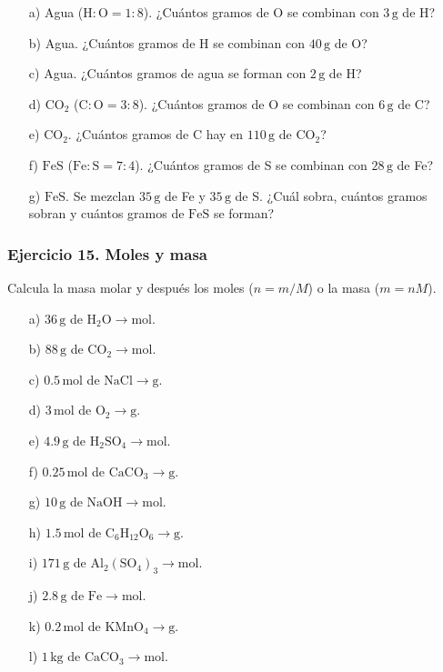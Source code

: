 \begin{enumerate}
    \item[a)] Agua ($\mathrm{H}:\mathrm{O}=1:8$).
    ¿Cuántos gramos de O se combinan con $3\,\mathrm{g}$ de H?
    \item[b)] Agua.
    ¿Cuántos gramos de H se combinan con $40\,\mathrm{g}$ de O?
    \item[c)] Agua.
    ¿Cuántos gramos de agua se forman con $2\,\mathrm{g}$ de H?
    \item[d)] $\mathrm{CO_2}$ ($\mathrm{C}:\mathrm{O}=3:8$).
    ¿Cuántos gramos de O se combinan con $6\,\mathrm{g}$ de C?
    \item[e)] $\mathrm{CO_2}$.
    ¿Cuántos gramos de C hay en $110\,\mathrm{g}$ de $\mathrm{CO_2}$?
    \item[f)] $\mathrm{FeS}$ ($\mathrm{Fe}:\mathrm{S}=7:4$).
    ¿Cuántos gramos de S se combinan con $28\,\mathrm{g}$ de Fe?
    \item[g)] $\mathrm{FeS}$.
    Se mezclan $35\,\mathrm{g}$ de Fe y $35\,\mathrm{g}$ de S.
    ¿Cuál sobra, cuántos gramos sobran y cuántos gramos de $\mathrm{FeS}$
    se forman?
\end{enumerate}

\subsubsection*{Ejercicio 15. Moles y masa}

Calcula la masa molar y después los moles ($n=m/M$)
o la masa ($m=nM$).

\begin{enumerate}
    \item[a)] $36\,\mathrm{g}$ de $\mathrm{H_2O}\rightarrow\mathrm{mol}$.
    \item[b)] $88\,\mathrm{g}$ de $\mathrm{CO_2}\rightarrow\mathrm{mol}$.
    \item[c)] $0.5\,\mathrm{mol}$ de $\mathrm{NaCl}\rightarrow\mathrm{g}$.
    \item[d)] $3\,\mathrm{mol}$ de $\mathrm{O_2}\rightarrow\mathrm{g}$.
    \item[e)] $4.9\,\mathrm{g}$ de $\mathrm{H_2SO_4}\rightarrow\mathrm{mol}$.
    \item[f)] $0.25\,\mathrm{mol}$ de $\mathrm{CaCO_3}\rightarrow\mathrm{g}$.
    \item[g)] $10\,\mathrm{g}$ de $\mathrm{NaOH}\rightarrow\mathrm{mol}$.
    \item[h)] $1.5\,\mathrm{mol}$ de $\mathrm{C_6H_{12}O_6}\rightarrow\mathrm{g}$.
    \item[i)] $171\,\mathrm{g}$ de $\mathrm{Al_2(SO_4)_3}\rightarrow\mathrm{mol}$.
    \item[j)] $2.8\,\mathrm{g}$ de $\mathrm{Fe}\rightarrow\mathrm{mol}$.
    \item[k)] $0.2\,\mathrm{mol}$ de $\mathrm{KMnO_4}\rightarrow\mathrm{g}$.
    \item[l)] $1\,\mathrm{kg}$ de $\mathrm{CaCO_3}\rightarrow\mathrm{mol}$.
\end{enumerate}

